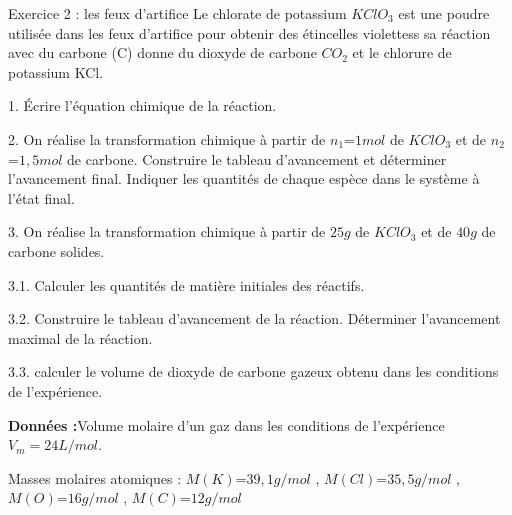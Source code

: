 \documentclass[12pt, french]{article}
\begin{document}
\begin{Box2}{Exercice 2 :  les feux d'artifice}
Le chlorate de potassium $KClO_3$ est une poudre utilisée dans les feux d'artifice pour obtenir des étincelles violettess
sa réaction avec du carbone (C) donne du dioxyde de carbone $CO_2$ et le chlorure de potassium KCl.

1. Écrire l’équation chimique de la réaction.

2. On réalise la transformation chimique à partir de $n_1$=$1 mol$ de $KClO_3$ et de $n_2$=$1,5 mol$ de carbone.
Construire le tableau d’avancement et déterminer l’avancement final. Indiquer les quantités de chaque espèce dans le
système à l’état final.

3. On réalise la transformation chimique à partir de $25 g$ de $KClO_3$ et de $40 g$ de carbone solides.

3.1. Calculer les quantités de matière initiales des réactifs.

3.2. Construire le tableau d’avancement de la réaction. Déterminer l’avancement maximal de la réaction.

3.3. calculer le volume de dioxyde de carbone gazeux obtenu dans les conditions de l’expérience.

\textbf{Données :}Volume molaire d’un gaz dans les conditions de l’expérience $V_m = 24L/mol$.

Masses molaires atomiques : $M(K)$=$39,1g/mol$ , $M(Cl)$=$35,5g/mol$ , $M(O)$=$16g/mol$ , $M(C)$=$12g/mol$
\end{Box2}
\end{document}
